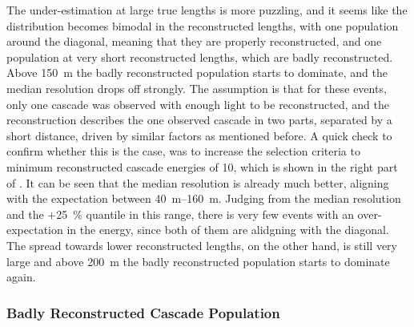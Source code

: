 The under-estimation at large true lengths is more puzzling, and it seems like the distribution becomes bimodal in the reconstructed lengths, with one population around the diagonal, meaning that they are properly reconstructed, and one population at very short reconstructed lengths, which are badly reconstructed. Above \SI{150}{\meter} the badly reconstructed population starts to dominate, and the median resolution drops off strongly. The assumption is that for these events, only one cascade was observed with enough light to be reconstructed, and the reconstruction describes the one observed cascade in two parts, separated by a short distance, driven by similar factors as mentioned before. A quick check to confirm whether this is the case, was to increase the selection criteria to minimum reconstructed cascade energies of \SI{10}{\gev}, which is shown in the right part of . It can be seen that the median resolution is already much better, aligning with the expectation between \SIrange[range-phrase=~and~]{40}{160}{\meter}. Judging from the median resolution and the $+$\SI{25}{\percent} quantile in this range, there is very few events with an over-expectation in the energy, since both of them are alidgning with the diagonal. The spread towards lower reconstructed lengths, on the other hand, is still very large and above \SI{200}{\meter} the badly reconstructed population starts to dominate again.




\subsubsection{Badly Reconstructed Cascade Population}

